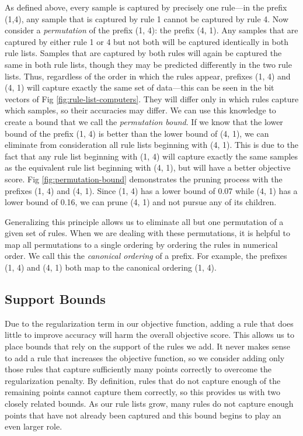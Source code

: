 As defined above, every sample is captured by precisely one rule---in the prefix (1,4), any sample that is captured by rule 1 cannot be captured by rule 4. 
Now consider a \textit{permutation} of the prefix (1, 4): the prefix (4, 1).
Any samples that are captured by either rule 1 or 4 but not both will be captured identically in both rule lists.
Samples that are captured by both rules will again be captured the same in both rule lists, though they may be predicted differently in the two rule lists.
Thus, regardless of the order in which the rules appear, prefixes (1, 4) and (4, 1) will capture exactly the same set of data---this can be seen in the bit vectors of Fig \ref{fig:rule-list-computers}.
They will differ only in which rules capture which samples, so their accuracies may differ.
We can use this knowledge to create a bound that we call the \textit{permutation bound}.
If we know that the lower bound of the prefix (1, 4) is better than the lower bound of (4, 1), we can eliminate from consideration all rule lists beginning with (4, 1).
This is due to the fact that any rule list beginning with (1, 4) will capture exactly the same samples as the equivalent rule list beginning with (4, 1), but will have a better objective score.
Fig \ref{fig:permutation-bound} demonstrates the pruning process with the prefixes (1, 4) and (4, 1).
Since (1, 4) has a lower bound of 0.07 while (4, 1) has a lower bound of 0.16, we can prune (4, 1) and not pursue any of its children.

Generalizing this principle allows us to eliminate all but one permutation of a given set of rules.
When we are dealing with these permutations, it is helpful to map all permutations to a single ordering by ordering the rules in numerical order.
We call this the \textit{canonical ordering} of a prefix.
For example, the prefixes (1, 4) and (4, 1) both map to the canonical ordering (1, 4).

\subsection{Support Bounds}
Due to the regularization term in our objective function, adding a rule that does little to improve accuracy will harm the overall objective score.
This allows us to place bounds that rely on the support of the rules we add.
It never makes sense to add a rule that increases the objective function, so we consider adding only those rules that capture sufficiently many points correctly to overcome the regularization penalty.
By definition, rules that do not capture enough of the remaining points cannot capture them correctly, so this provides us with two closely related bounds.
As our rule lists grow, many rules do not capture enough points that have not already been captured and this bound begins to play an even larger role.

